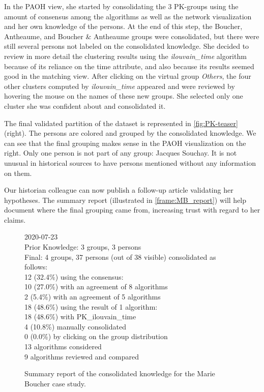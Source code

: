 In the PAOH view, she started by consolidating the 3 PK-groups using the amount of consensus among the algorithms as well as the network visualization and her own knowledge of the persons. At the end of this step, the Boucher, Antheaume, and Boucher \& Antheaume groups were consolidated, but there were still several persons not labeled on the consolidated knowledge. She decided to review in more detail the clustering results using the \emph{ilouvain\_time} algorithm because of its reliance on the time attribute, and also because its results seemed good in the matching view. After clicking on the virtual group \emph{Others}, the four other clusters computed by \emph{ilouvain\_time} appeared and were reviewed by hovering the mouse on the names of these new groups.
She selected only one cluster she was confident about and consolidated it.

The final validated partition of the dataset is represented in \autoref{fig:PK-teaser} (right).
The persons are colored and grouped by the consolidated knowledge. We can see that the final grouping makes sense in the PAOH visualization on the right. Only one person is not part of any group: Jacques Souchay. It is not unusual in historical sources to have persons mentioned without any information on them. %

Our historian colleague can now publish a follow-up article validating her hypotheses. The summary report (illustrated in \autoref{frame:MB_report}) will help document where the final grouping came from, increasing trust with regard to her claims.

\begin{figure}[htbp]
\centering
\begin{mdframed}[userdefinedwidth=\linewidth]
2020-07-23 \\
Prior Knowledge: 3 groups, 3 persons \\
Final: 4 groups, 37 persons (out of 38 visible) consolidated as follows: \\
12 (32.4\%) using the consensus: \\
\hspace*{2em} 10 (27.0\%) with an agreement of 8 algorithms \\
\hspace*{2em} 2 (5.4\%) with an agreement of 5 algorithms \\
18 (48.6\%) using the result of 1 algorithm: \\
\hspace*{2em} 18 (48.6\%) with PK\_ilouvain\_time \\
4 (10.8\%) manually consolidated \\
0 (0.0\%) by clicking on the group distribution \\
13 algorithms considered \\
9 algorithms reviewed and compared
\end{mdframed}
\caption{Summary report of the consolidated knowledge for the Marie Boucher case study.}
    \label{frame:MB_report}
\end{figure}


